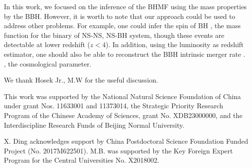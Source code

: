 \documentclass[twocolumn]{aastex62}
\begin{document}
In this work, we focused on the inference of the BHMF using the mass properties by the BBH. However, it is worth to note that our approach could be used to address other problems. For example, one could infer the spin of BH \citep{Abbott2018b}, the mass function for the binary of NS-NS, NS-BH system, though these events are detectable at lower redshift ($z<4$). In addition, using the luminosity as redshift estimator, one should also be able to reconstruct the BBH intrinsic merger rate \citep{Fishbach2018}. 
, the cosmological parameter.


\acknowledgments
We thank Hosek Jr., M.W for the useful discussion.

This work was supported by the National Natural Science Foundation of China under grant Nos. 11633001 and 11373014, the Strategic Priority Research Program of the Chinese Academy of Sciences, grant No. XDB23000000, and the Interdiscipline Research Funds of Beijing Normal University.

X. Ding acknowledges support by China Postdoctoral Science Foundation Funded Project (No. 2017M622501).
M.B. was supported by the Key Foreign Expert Program for the Central Universities No. X2018002.


%


\end{document}
